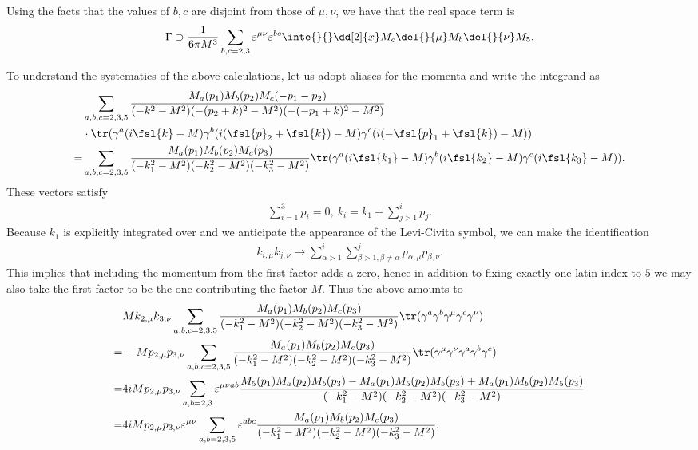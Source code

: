 Using the facts that the values of $b, c$ are disjoint from those of $\mu, \nu$, we have that the real space term is
\begin{align*}
	\Gamma \supset \frac{1}{6\pi M^{3}}\sum\limits_{b, c = 2, 3}\varepsilon^{\mu\nu}\varepsilon^{bc}\inte{}{}\dd[2]{x}M_{c}\del{}{\mu}M_{b}\del{}{\nu}M_{5}.
\end{align*}

To understand the systematics of the above calculations, let us adopt aliases for the momenta and write the integrand as
\begin{align*}
	 &\sum\limits_{a, b, c = 2, 3, 5}\frac{M_{a}(p_{1})M_{b}(p_{2})M_{c}(-p_{1} - p_{2})}{(-k^{2} - M^{2})(-(p_{2} + k)^{2} - M^{2})(-(-p_{1} + k)^{2} - M^{2})} \\
	 &\cdot\tr(\gamma^{a}(i\fsl{k} - M)\gamma^{b}(i(\fsl{p}_{2} + \fsl{k}) - M)\gamma^{c}(i(-\fsl{p}_{1} + \fsl{k}) - M)) \\
	=& \sum\limits_{a, b, c = 2, 3, 5}\frac{M_{a}(p_{1})M_{b}(p_{2})M_{c}(p_{3})}{(-k_{1}^{2} - M^{2})(-k_{2}^{2} - M^{2})(-k_{3}^{2} - M^{2})}\tr(\gamma^{a}(i\fsl{k_{1}} - M)\gamma^{b}(i\fsl{k_{2}} - M)\gamma^{c}(i\fsl{k_{3}} - M)).
\end{align*}
These vectors satisfy
\begin{align*}
	\sum\limits_{i = 1}^{3}p_{i} = 0,\ k_{i} = k_{1} + \sum\limits_{j > 1}^{i}p_{j}.
\end{align*}
Because $k_{1}$ is explicitly integrated over and we anticipate the appearance of the Levi-Civita symbol, we can make the identification
\begin{align*}
	k_{i, \mu}k_{j, \nu} \to \sum\limits_{\alpha > 1}^{i}\sum\limits_{\beta > 1, \beta \neq \alpha}^{j}p_{\alpha, \mu}p_{\beta, \nu}.
\end{align*}
This implies that including the momentum from the first factor adds a zero, hence in addition to fixing exactly one latin index to $5$ we may also take the first factor to be the one contributing the factor $M$. Thus the above amounts to
\begin{align*}
	 &Mk_{2, \mu}k_{3, \nu}\sum\limits_{a, b, c = 2, 3, 5}\frac{M_{a}(p_{1})M_{b}(p_{2})M_{c}(p_{3})}{(-k_{1}^{2} - M^{2})(-k_{2}^{2} - M^{2})(-k_{3}^{2} - M^{2})}\tr(\gamma^{a}\gamma^{b}\gamma^{\mu}\gamma^{c}\gamma^{\nu}) \\
	=& -Mp_{2, \mu}p_{3, \nu}\sum\limits_{a, b, c = 2, 3, 5}\frac{M_{a}(p_{1})M_{b}(p_{2})M_{c}(p_{3})}{(-k_{1}^{2} - M^{2})(-k_{2}^{2} - M^{2})(-k_{3}^{2} - M^{2})}\tr(\gamma^{\mu}\gamma^{\nu}\gamma^{a}\gamma^{b}\gamma^{c}) \\
	=& 4iMp_{2, \mu}p_{3, \nu}\sum\limits_{a, b = 2, 3}\varepsilon^{\mu\nu ab}\frac{M_{5}(p_{1})M_{a}(p_{2})M_{b}(p_{3}) - M_{a}(p_{1})M_{5}(p_{2})M_{b}(p_{3}) + M_{a}(p_{1})M_{b}(p_{2})M_{5}(p_{3})}{(-k_{1}^{2} - M^{2})(-k_{2}^{2} - M^{2})(-k_{3}^{2} - M^{2})} \\
	=& 4iMp_{2, \mu}p_{3, \nu}\varepsilon^{\mu\nu}\sum\limits_{a, b = 2, 3, 5}\varepsilon^{abc}\frac{M_{a}(p_{1})M_{b}(p_{2})M_{c}(p_{3})}{(-k_{1}^{2} - M^{2})(-k_{2}^{2} - M^{2})(-k_{3}^{2} - M^{2})}.
\end{align*}
